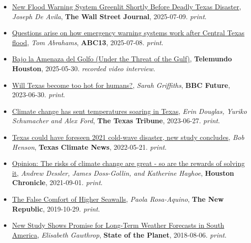 \documentclass[10pt,oneside]{article}
\begin{document}
\begin{itemize}[label={}]
    \item \href{https://www.wsj.com/us-news/climate-environment/texas-guadalupe-flood-threat-system-06c29954}{New Flood Warning System Greenlit Shortly Before Deadly Texas Disaster}, \textit{Joseph De Avila}, \textbf{The Wall Street Journal}, 2025-07-09.
    \textsl{print}.
        
    \item \href{https://abc13.com/post/questions-arise-how-emergency-warning-systems-work-central-texas-flood/17024010/}{Questions arise on how emergency warning systems work after Central Texas flood}, \textit{Tom Abrahams}, \textbf{ABC13}, 2025-07-08.
    \textsl{print}.
        
    \item \href{https://www.telemundohouston.com/noticias/bajo-la-amenaza-del-golfo-parte-1-2/2494095/}{Bajo la Amenaza del Golfo (Under the Threat of the Gulf)}, \textbf{Telemundo Houston}, 2025-05-30.
    \textsl{recorded video interview}.
        
    \item \href{https://www.bbc.com/future/article/20230630-will-texas-become-too-hot-for-humans}{Will Texas become too hot for humans?}, \textit{Sarah Griffiths}, \textbf{BBC Future}, 2023-06-30.
    \textsl{print}.
        
    \item \href{https://www.texastribune.org/2023/06/27/texas-climate-change-heat/}{Climate change has sent temperatures soaring in Texas}, \textit{Erin Douglas, Yuriko Schumacher and Alex Ford}, \textbf{The Texas Tribune}, 2023-06-27.
    \textsl{print}.
        
    \item \href{https://texasclimatenews.org/2022/05/21/texas-could-have-foreseen-2021-cold-wave-disaster-new-study-concludes/}{Texas could have foreseen 2021 cold-wave disaster, new study concludes}, \textit{Bob Henson}, \textbf{Texas Climate News}, 2022-05-21.
    \textsl{print}.
        
    \item \href{https://www.houstonchronicle.com/opinion/outlook/article/Opinion-The-risks-of-climate-change-are-great-16426616.php}{Opinion: The risks of climate change are great - so are the rewards of solving it}, \textit{Andrew Dessler, James Doss-Gollin, and Katherine Hayhoe}, \textbf{Houston Chronicle}, 2021-09-01.
    \textsl{print}.
        
    \item \href{https://newrepublic.com/article/155519/false-comfort-higher-seawalls}{The False Comfort of Higher Seawalls}, \textit{Paola Rosa-Aquino}, \textbf{The New Republic}, 2019-10-29.
    \textsl{print}.
        
    \item \href{https://blogs.ei.columbia.edu/2018/08/06/subseasonal-weather-forecasts-paraguay/}{New Study Shows Promise for Long-Term Weather Forecasts in South America}, \textit{Elisabeth Gawthrop}, \textbf{State of the Planet}, 2018-08-06.
    \textsl{print}.
        
\end{itemize}
\end{document}

